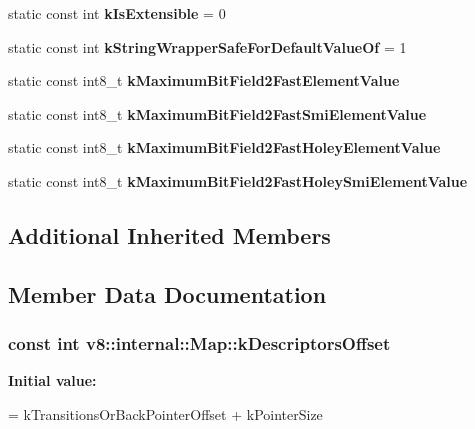 \begin{DoxyCompactItemize}
\item 
\hypertarget{classv8_1_1internal_1_1_map_a022e2df17d0a2b317d930dad7cba8f7d}{}static const int {\bfseries k\+Is\+Extensible} = 0\label{classv8_1_1internal_1_1_map_a022e2df17d0a2b317d930dad7cba8f7d}

\item 
\hypertarget{classv8_1_1internal_1_1_map_a4dc68fcf0448b89923f2303d6826c1d6}{}static const int {\bfseries k\+String\+Wrapper\+Safe\+For\+Default\+Value\+Of} = 1\label{classv8_1_1internal_1_1_map_a4dc68fcf0448b89923f2303d6826c1d6}

\item 
static const int8\+\_\+t {\bfseries k\+Maximum\+Bit\+Field2\+Fast\+Element\+Value}
\item 
static const int8\+\_\+t {\bfseries k\+Maximum\+Bit\+Field2\+Fast\+Smi\+Element\+Value}
\item 
static const int8\+\_\+t {\bfseries k\+Maximum\+Bit\+Field2\+Fast\+Holey\+Element\+Value}
\item 
static const int8\+\_\+t {\bfseries k\+Maximum\+Bit\+Field2\+Fast\+Holey\+Smi\+Element\+Value}
\end{DoxyCompactItemize}
\subsection*{Additional Inherited Members}


\subsection{Member Data Documentation}
\hypertarget{classv8_1_1internal_1_1_map_a3d34f199f4ebb5b7d9170c74c2ac5fca}{}
\subsubsection[{k\+Descriptors\+Offset}]{\setlength{\rightskip}{0pt plus 5cm}const int v8\+::internal\+::\+Map\+::k\+Descriptors\+Offset\hspace{0.3cm}{\ttfamily [static]}}\label{classv8_1_1internal_1_1_map_a3d34f199f4ebb5b7d9170c74c2ac5fca}
{\bfseries Initial value\+:}
\begin{DoxyCode}
=
      kTransitionsOrBackPointerOffset + kPointerSize
\end{DoxyCode}
\hypertarget{classv8_1_1internal_1_1_map_abb892ea4c12b68553185322a4c851be9}{}
